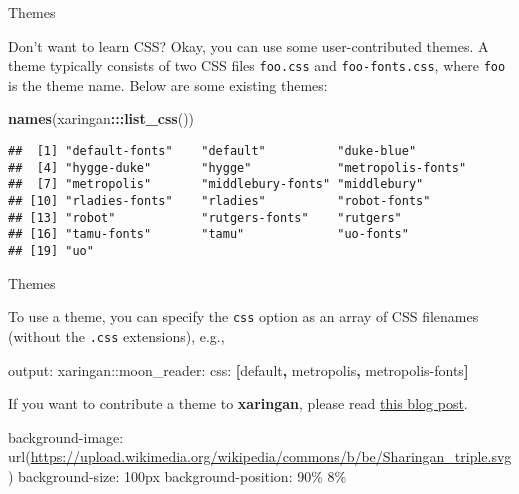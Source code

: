 \documentclass[ignorenonframetext,]{beamer}
\newenvironment{Shaded}{\begin{snugshade}}{\end{snugshade}}
\newcommand{\AttributeTok}[1]{\textcolor[rgb]{0.77,0.63,0.00}{#1}}
\newcommand{\FunctionTok}[1]{\textcolor[rgb]{0.00,0.00,0.00}{#1}}
\newcommand{\KeywordTok}[1]{\textcolor[rgb]{0.13,0.29,0.53}{\textbf{#1}}}
\newcommand{\NormalTok}[1]{#1}
\newcommand{\OperatorTok}[1]{\textcolor[rgb]{0.81,0.36,0.00}{\textbf{#1}}}
\begin{document}
\begin{frame}[fragile]{Themes}
\protect\hypertarget{themes}{}

Don't want to learn CSS? Okay, you can use some user-contributed themes.
A theme typically consists of two CSS files \texttt{foo.css} and
\texttt{foo-fonts.css}, where \texttt{foo} is the theme name. Below are
some existing themes:

\begin{Shaded}
\begin{Highlighting}[]
\KeywordTok{names}\NormalTok{(xaringan}\OperatorTok{:::}\KeywordTok{list_css}\NormalTok{())}
\end{Highlighting}
\end{Shaded}

\begin{verbatim}
##  [1] "default-fonts"    "default"          "duke-blue"       
##  [4] "hygge-duke"       "hygge"            "metropolis-fonts"
##  [7] "metropolis"       "middlebury-fonts" "middlebury"      
## [10] "rladies-fonts"    "rladies"          "robot-fonts"     
## [13] "robot"            "rutgers-fonts"    "rutgers"         
## [16] "tamu-fonts"       "tamu"             "uo-fonts"        
## [19] "uo"
\end{verbatim}

\end{frame}

\begin{frame}[fragile]{Themes}
\protect\hypertarget{themes-1}{}

To use a theme, you can specify the \texttt{css} option as an array of
CSS filenames (without the \texttt{.css} extensions), e.g.,

\begin{Shaded}
\begin{Highlighting}[]
\FunctionTok{output:}
  \FunctionTok{xaringan:}\AttributeTok{:moon_reader:}
    \FunctionTok{css:}\AttributeTok{ }\KeywordTok{[}\NormalTok{default}\KeywordTok{,}\NormalTok{ metropolis}\KeywordTok{,}\NormalTok{ metropolis-fonts}\KeywordTok{]}
\end{Highlighting}
\end{Shaded}

If you want to contribute a theme to \textbf{xaringan}, please read
\href{https://yihui.name/en/2017/10/xaringan-themes}{this blog post}.

background-image:
url(\url{https://upload.wikimedia.org/wikipedia/commons/b/be/Sharingan_triple.svg})
background-size: 100px background-position: 90\% 8\%

\end{frame}
\end{document}
